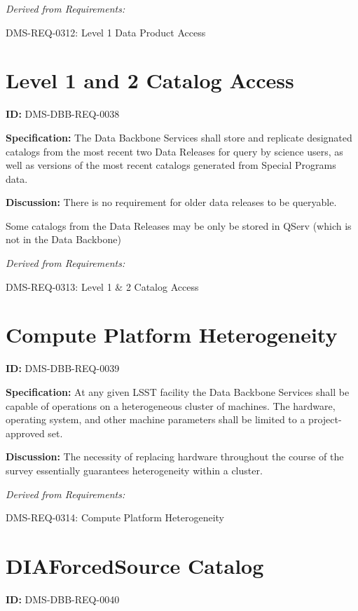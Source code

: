 \documentclass[SE,toc,lsstdraft]{lsstdoc}
\begin{document}
\emph{Derived from Requirements:}

DMS-REQ-0312:
Level 1 Data Product Access \newline

\section{Level 1 and 2 Catalog Access}

\label{DMS-DBB-REQ-0038}
\textbf{ID:} DMS-DBB-REQ-0038

\textbf{Specification:}
The Data Backbone Services shall store and replicate designated catalogs from the most recent two Data Releases for query by science users, as well as versions of the most recent catalogs generated from Special Programs data.

\textbf{Discussion:}
There is no requirement for older data releases to be queryable.

Some catalogs from the Data Releases may be only be stored in QServ (which is not in the Data Backbone)

\emph{Derived from Requirements:}

DMS-REQ-0313:
Level 1 \& 2 Catalog Access \newline

\section{Compute Platform Heterogeneity}

\label{DMS-DBB-REQ-0039}
\textbf{ID:} DMS-DBB-REQ-0039

\textbf{Specification:}
At any given LSST facility the Data Backbone Services shall be capable of operations on a heterogeneous cluster of machines. The hardware, operating system, and other machine parameters shall be limited to a project-approved set.

\textbf{Discussion:}
The necessity of replacing hardware throughout the course of the survey essentially guarantees heterogeneity within a cluster.

\emph{Derived from Requirements:}

DMS-REQ-0314:
Compute Platform Heterogeneity \newline

\section{DIAForcedSource Catalog}

\label{DMS-DBB-REQ-0040}
\textbf{ID:} DMS-DBB-REQ-0040
\end{document}
